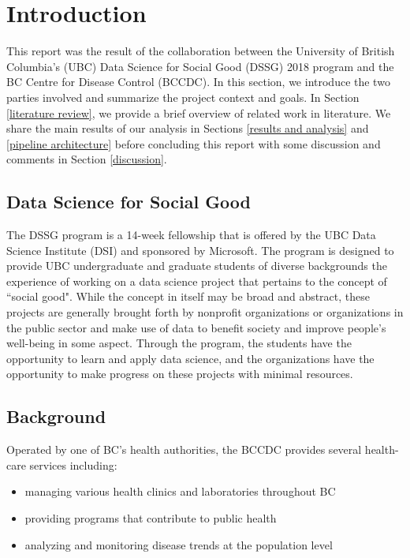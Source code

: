 \documentclass[11pt]{article}
\begin{document}
\newpage

\tableofcontents

\newpage


\section{Introduction} \label{introduction}

This report was the result of the collaboration between the University of British Columbia's (UBC) Data Science for Social Good (DSSG) 2018 program and the BC Centre for Disease Control (BCCDC). In this section, we introduce the two parties involved and summarize the project context and goals. In Section \ref{literature review}, we provide a brief overview of related work in literature. We share the main results of our analysis in Sections \ref{results and analysis} and \ref{pipeline architecture} before concluding this report with some discussion and comments in Section \ref{discussion}.


\subsection{Data Science for Social Good} \label{data science for social good}

The DSSG program is a 14-week fellowship that is offered by the UBC Data Science Institute (DSI) and sponsored by Microsoft. The program is designed to provide UBC undergraduate and graduate students of diverse backgrounds the experience of working on a data science project that pertains to the concept of ``social good". While the concept in itself may be broad and abstract, these projects are generally brought forth by nonprofit organizations or organizations in the public sector and make use of data to benefit society and improve people's well-being in some aspect. Through the program, the students have the opportunity to learn and apply data science, and the organizations have the opportunity to make progress on these projects with minimal resources.


\subsection{Background} \label{background}

Operated by one of BC's health authorities, the BCCDC provides several health-care services including:

\begin{itemize}

\item managing various health clinics and laboratories throughout BC

\item providing programs that contribute to public health

\item analyzing and monitoring disease trends at the population level

\end{itemize}
\end{document}
